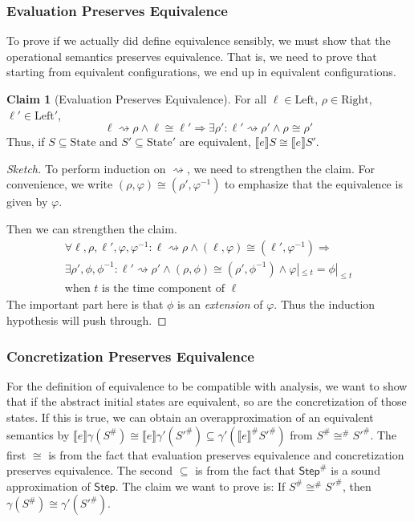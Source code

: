 \documentclass{article}
\theoremstyle{definition}
\newtheorem{clm}{Claim}[section]
\newcommand*{\Abs}[1]{{#1}^{\#}}
\newcommand*{\Left}{\text{Left}}
\newcommand*{\Right}{\text{Right}}
\newcommand*{\State}{\text{State}}
\newcommand*{\Step}{\mathsf{Step}}
\newcommand*{\semarrow}{\rightsquigarrow}
\newcommand*{\sembracket}[1]{\lBrack{#1}\rBrack}
\begin{document}
\subsubsection{Evaluation Preserves Equivalence}
To prove if we actually did define equivalence sensibly, we must show that the operational semantics preserves equivalence.
That is, we need to prove that starting from equivalent configurations, we end up in equivalent configurations.
\begin{clm}[Evaluation Preserves Equivalence]
  For all $\ell\in\Left$, $\rho\in\Right$, $\ell'\in\Left'$,
  \[\ell\semarrow\rho\wedge\ell\cong\ell'\Rightarrow\exists\rho':\ell'\semarrow\rho'\wedge\rho\cong\rho'\]
  Thus, if $S\subseteq\State$ and $S'\subseteq\State'$ are equivalent, $\sembracket{e}S\cong\sembracket{e}S'$.
\end{clm}
\begin{proof}[Sketch]
  To perform induction on $\semarrow$, we need to strengthen the claim.
  For convenience, we write $(\rho,\varphi)\cong(\rho',\varphi^{-1})$ to emphasize that the equivalence is given by $\varphi$.

  Then we can strengthen the claim.
  \[
    \begin{array}{l}
      \forall\ell,\rho,\ell',\varphi,\varphi^{-1}:\ell\semarrow\rho\wedge(\ell,\varphi)\cong(\ell',\varphi^{-1})\Rightarrow              \\
      \exists\rho',\phi,\phi^{-1}:\ell'\semarrow\rho'\wedge(\rho,\phi)\cong(\rho',\phi^{-1})\wedge\varphi|_{\le t}=\phi|_{\le t} \\
      \text{when }t\text{ is the time component of }\ell
    \end{array}
  \]
  The important part here is that $\phi$ is an \emph{extension} of $\varphi$.
  Thus the induction hypothesis will push through.
\end{proof}

\subsubsection{Concretization Preserves Equivalence}
For the definition of equivalence to be compatible with analysis, we want to show that if the abstract initial states are equivalent, so are the concretization of those states.
If this is true, we can obtain an overapproximation of an equivalent semantics by $\sembracket{e}\gamma(\Abs{S})\cong\sembracket{e}\gamma'(\Abs{S'})\subseteq\gamma'(\Abs{\sembracket{e}}\Abs{S'})$ from $\Abs{S}\Abs\cong\Abs{S'}$.
The first $\cong$ is from the fact that evaluation preserves equivalence and concretization preserves equivalence.
The second $\subseteq$ is from the fact that $\Abs\Step$ is a sound approximation of $\Step$.
The claim we want to prove is: If $\Abs{S}\Abs\cong\Abs{S'}$, then $\gamma(\Abs{S})\cong\gamma'(\Abs{S'})$.
\end{document}

